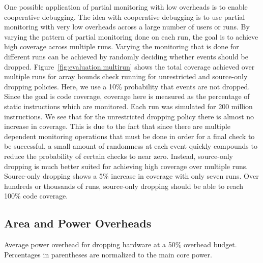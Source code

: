 One possible application of partial monitoring with low overheads is to enable
cooperative debugging. The idea with cooperative debugging is to use partial
monitoring with very low overheads across a large number of users or runs. By
varying the pattern of partial monitoring done on each run, the goal is to
achieve high coverage across multiple runs. Varying the monitoring that is
done for different runs can be achieved by randomly deciding whether events
should be dropped.
Figure~\ref{fig:evaluation.multirun} shows the total
coverage achieved over multiple runs for array bounds check running for
unrestricted and source-only dropping policies. Here, we use a 10\% probability
that events are not dropped. Since the goal is code coverage, coverage here is
measured as the percentage of static instructions which are monitored. Each run
was simulated for 200 million instructions. 
We see that for the unrestricted dropping policy there is almost no increase in
coverage.  This is due to the fact that since there are multiple dependent
monitoring operations that must be done in order for a final check to be
successful, a small amount of randomness at each event quickly compounds to
reduce the probability of certain checks to near zero. Instead, source-only
dropping is much better suited for achieving high coverage over multiple runs.
Source-only dropping shows a 5\% increase in coverage with only seven runs.
Over hundreds or thousands of runs, source-only dropping should be able to
reach 100\% code coverage.

\subsection{Area and Power Overheads}

\begin{table}[tb]
  \begin{center}
    \vspace{-0.0in}
    \begin{footnotesize}
    
    \end{footnotesize}
    \caption{Average power overhead for dropping hardware at a 50\% overhead
    budget. Percentages in parentheses are normalized to the main core
    power.}
    \vspace{-0.2in}
    \label{tab:evaluation.area_power}
  \end{center}
\end{table}

